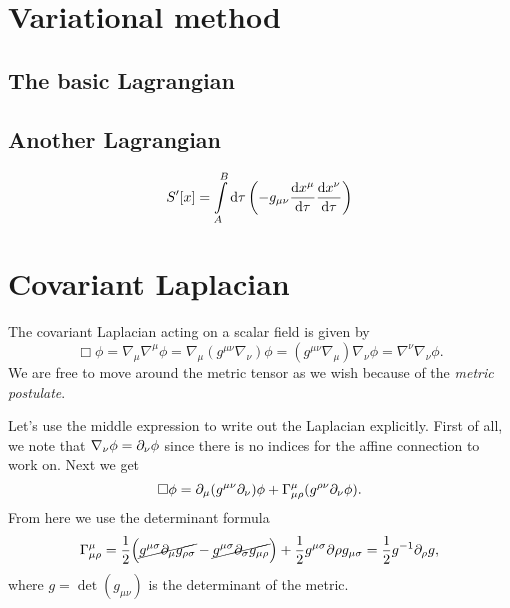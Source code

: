 \documentclass[11pt,a4paper, 
swedish, english %
]{article}
\begin{document}
\section{Variational method}

\subsection{The basic Lagrangian}

\subsection{Another Lagrangian}
\begin{equation}\label{eq5:Lagrangian2}
S'[x]=\int_A^B\rd\tau\,\qty(-g_{\mu\nu}\dv{x^\mu}{\tau}\dv{x^\nu}{\tau})
\end{equation}



\section{Covariant Laplacian}
\swapcommands{\phi}{\varphi}
The covariant Laplacian acting on a scalar field is given by
\begin{equation}
\Box\phi=\nabla_\mu\nabla^\mu\phi=\nabla_\mu(g^{\mu\nu}\nabla_\nu)\phi
=(g^{\mu\nu}\nabla_\mu)\nabla_\nu\phi
=\nabla^\nu\nabla_\nu\phi.
\end{equation}
We are free to move around the metric tensor as we wish because of the
\emph{metric postulate}.

Let's use the middle expression to write out the Laplacian
explicitly. First of all, we note that $\nabla_\nu\phi=\partial_\nu\phi$
since there is no indices for the affine connection to work on. Next
we get
\begin{equation}
\Box\phi=\partial_\mu(g^{\mu\nu}\partial_\nu)\phi
+\Gamma^\mu_{\mu\rho}(g^{\rho\nu}\partial_{\nu}\phi).
\end{equation}
From here we use the determinant formula
\begin{equation}\label{eq:det-formula}
\Gamma^\mu_{\mu\rho}=\frac{1}{2}
\Big(\cancel{g^{\mu\sigma}\partial_\mu g_{\rho\sigma}}
-\cancel{g^{\mu\sigma}\partial_\sigma g_{\mu\rho}} \Big)
+\frac{1}{2}g^{\mu\sigma}\partial\rho g_{\mu\sigma}
=\frac{1}{2}g^{-1}\partial_\rho g,
\end{equation}
where $g=\det(g_{\mu\nu})$ is the determinant of the metric.
\end{document}
